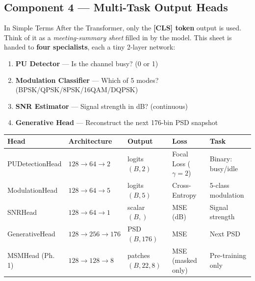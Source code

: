 \documentclass[11pt,a4paper]{article}
\begin{document}
\subsection{Component 4 — Multi-Task Output Heads}

\begin{note}{In Simple Terms}
After the Transformer, only the \textbf{[CLS] token} output is used.
Think of it as a \emph{meeting-summary sheet} filled in by the model.
This sheet is handed to \textbf{four specialists}, each a tiny
2-layer network:
\begin{enumerate}[nosep]
  \item \textbf{PU Detector} — Is the channel busy? (0 or 1)
  \item \textbf{Modulation Classifier} — Which of 5 modes? (BPSK/QPSK/8PSK/16QAM/DQPSK)
  \item \textbf{SNR Estimator} — Signal strength in dB? (continuous)
  \item \textbf{Generative Head} — Reconstruct the next 176-bin PSD snapshot
\end{enumerate}
\end{note}

\begin{center}
\renewcommand{\arraystretch}{1.25}
\begin{tabular}{lllll}
\toprule
\textbf{Head} & \textbf{Architecture} & \textbf{Output} & \textbf{Loss} & \textbf{Task} \\
\midrule
PUDetectionHead   & $128\!\to\!64\!\to\!2$   & logits $(B,2)$   & Focal Loss ($\gamma{=}2$)  & Binary: busy/idle \\
ModulationHead    & $128\!\to\!64\!\to\!5$   & logits $(B,5)$   & Cross-Entropy              & 5-class modulation \\
SNRHead           & $128\!\to\!64\!\to\!1$   & scalar $(B,)$    & MSE (dB)                   & Signal strength \\
GenerativeHead    & $128\!\to\!256\!\to\!176$ & PSD $(B,176)$   & MSE                        & Next PSD \\
MSMHead (Ph.\,1)  & $128\!\to\!128\!\to\!8$  & patches $(B,22,8)$ & MSE (masked only)        & Pre-training only \\
\bottomrule
\end{tabular}
\end{center}
\end{document}
